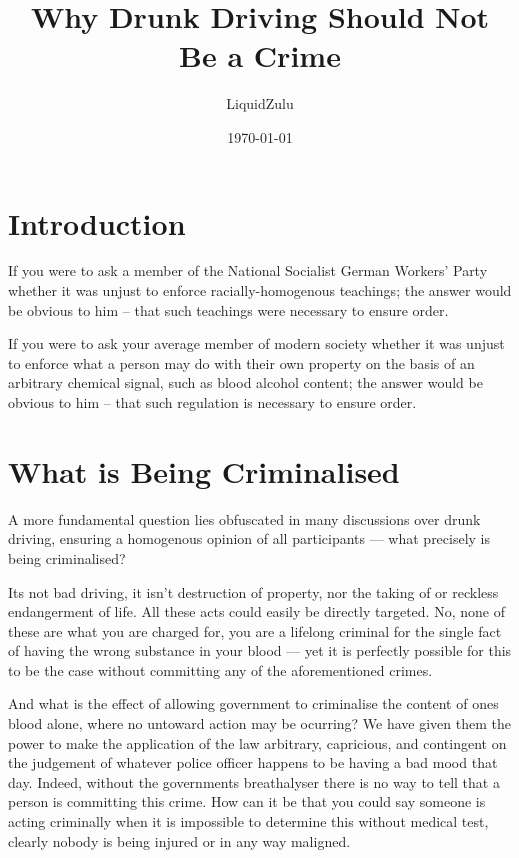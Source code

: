 \documentclass[11pt]{article}
\author{LiquidZulu}
\date{\today}
\title{Why Drunk Driving Should Not Be a Crime}
\begin{document}
\maketitle
\tableofcontents

\newpage
\section{Introduction}
\label{sec:org14bc689}
If you were to ask a member of the National Socialist German Workers' Party whether it was unjust to enforce racially-homogenous teachings; the answer would be obvious to him -- that such teachings were necessary to ensure order.

If you were to ask your average member of modern society whether it was unjust to enforce what a person may do with their own property on the basis of an arbitrary chemical signal, such as blood alcohol content; the answer would be obvious to him -- that such regulation is necessary to ensure order.


\section{What is Being Criminalised}
\label{sec:orgd4b2b0b}

A more fundamental question lies obfuscated in many discussions over drunk driving, ensuring a homogenous opinion of all participants --- what precisely is being criminalised?

Its not bad driving, it isn't destruction of property, nor the taking of or reckless endangerment of life. All these acts could easily be directly targeted. No, none of these are what you are charged for, you are a lifelong criminal for the single fact of having the wrong substance in your blood --- yet it is perfectly possible for this to be the case without committing any of the aforementioned crimes.

And what is the effect of allowing government to criminalise the content of ones blood alone, where no untoward action may be ocurring? We have given them the power to make the application of the law arbitrary, capricious, and contingent on the judgement of whatever police officer happens to be having a bad mood that day. Indeed, without the governments breathalyser there is no way to tell that a person is committing this crime. How can it be that you could say someone is acting criminally when it is impossible to determine this without medical test, clearly nobody is being injured or in any way maligned.
\end{document}

